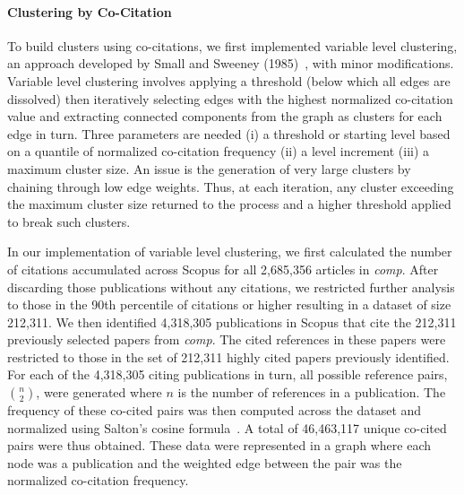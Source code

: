 \paragraph{Clustering by Co-Citation} To build clusters using co-citations, we first implemented variable level clustering, an approach developed by Small and Sweeney (1985)~\cite{small_clustering_1985}, with minor modifications. Variable level clustering involves applying a threshold (below which all edges are dissolved) then iteratively selecting edges with the highest normalized co-citation value and extracting connected components from the graph as clusters for each edge in turn. Three parameters are needed (i) a threshold or starting level based on a quantile of normalized co-citation frequency (ii) a level increment (iii) a maximum cluster size. An issue is the generation of very large clusters by chaining through low edge weights.  Thus, at each iteration, any cluster exceeding the maximum cluster size returned to the process and a higher threshold applied to break such clusters.

In our implementation of variable level clustering, we first calculated the number of citations accumulated across Scopus for all 2,685,356 articles in \emph{comp}. After discarding those publications without any citations, we restricted further analysis to those in the 90th percentile of citations or higher resulting in a dataset of size 212,311. We then identified 4,318,305 publications in Scopus that cite the 212,311 previously selected papers from \emph{comp}. The cited references in these papers were restricted to those in the set of 212,311 highly cited papers previously identified. For each of the 4,318,305 citing publications in turn, all possible reference pairs, ${n \choose 2}$, were generated where $n$ is the number of references in a publication. The frequency of these co-cited pairs was then computed across the dataset  and normalized using Salton's cosine formula~\cite{salton_citation_1979}. A total of 46,463,117 unique co-cited pairs were thus obtained. These data were represented in a graph where each node was a publication and the weighted edge between the pair was the normalized co-citation frequency. \par

